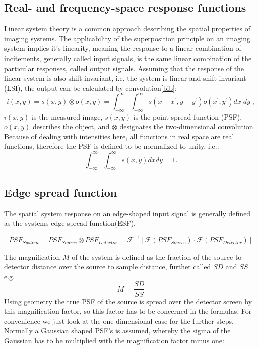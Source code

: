 \subsection{Real- and frequency-space response functions } \label{subsec:ct}
\noindent Linear system theory is a common approach describing the spatial properties of imaging systems. 
The applicability of the superposition principle on an imaging system implies it's linearity, 
meaning the response to a linear combination of incitements, generally called input signals, 
is the same linear combination of the particular responses, called output signals. 
Assuming that the response of the linear system is also shift invariant, i.e. the system is linear and shift invariant (LSI), 
the output can be calculated by convolution\ref{bib}: 
\begin{equation}
i(x,y) = s(x,y) \otimes o(x,y) = \int_{-\infty}^{\infty}\int_{-\infty}^{\infty}s(x-x^{'},y-y^{'})o(x^{'},y^{'})dx^{'}dy^{'},
\end{equation}
$i(x,y)$ is the measured image, $s(x,y)$ is the point spread function (PSF), $o(x,y)$ describes the object, 
and $\otimes$ designates the two-dimensional convolution. Because of dealing with intensities here, 
all functions in real space are real functions, therefore the PSF is defined to be normalized to unity, i.e.:
\begin{equation}
\int_{-\infty}^{\infty}\int_{-\infty}^{\infty} s(x,y)dxdy = 1.
\end{equation}  
\subsection{Edge spread function} \label{subsec:esf}
The spatial system response on an edge-shaped input signal is generally defined as the systems edge spread function(ESF).

\begin{equation}
PSF_{System} = PSF_{Source} \otimes PSF_{Detector} = \mathcal{F^{-1}}[\mathcal{F}(PSF_{Source})\cdot \mathcal{F}(PSF_{Detector})]
\end{equation}

The magnification $M$ of the system is defined as the fraction of the source to detector distance over the source to sample distance, further called $SD$ and $SS$ e.g.
\begin{equation}
M = \frac{SD}{SS}
\end{equation}
Using geometry the true PSF of the source is spread over the detector screen by this magnification factor, so this factor has to be concerned
in the formulas. For convenience we just look at the one-dimensional case for the further steps. 
Normally a Gaussian shaped PSF's is assumed, whereby the sigma of the Gaussian has to be multiplied with the magnification factor minus one:

